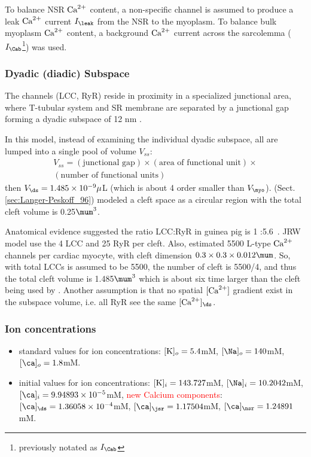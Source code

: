 To balance NSR ${\text{Ca}^{2+}}$ content, a non-specific channel is assumed to produce a
leak ${\text{Ca}^{2+}}$ current $I_\leak$ from the NSR to the myoplasm. To balance bulk 
myoplasm ${\text{Ca}^{2+}}$ content, a background ${\text{Ca}^{2+}}$ current across the sarcolemma
($I_\Cab$\footnote{previously notated as $I_\Cab$}) was used.

\subsubsection{Dyadic (diadic) Subspace}
\label{sec:diadic_subspace}


The channels (LCC, RyR) reside in proximity in a specialized
junctional area, where T-tubular system and SR membrane are
separated by a junctional gap forming a dyadic subspace of 12 nm
\citep{frank1990}.

In this model, instead of examining the individual dyadic subspace, all are
lumped into a single pool of volume $V_{ss}$:
\begin{equation}
  \label{eq:778}
  \begin{split}
    V_{ss} = (\text{junctional gap})\times (\text{area of functional
      unit}) \times \\
    (\text{number of functional units})
  \end{split}
\end{equation}
then $V_\ds = 1.485\times 10^{-9}\mu$L (which is about 4 order
smaller than $V_\myo$). \citep{langer1996} (Sect.\ref{sec:Langer-Peskoff_96})
modeled a cleft space as a circular region with the total cleft volume is 0.25$\mum^3$.

Anatomical evidence suggested the ratio LCC:RyR in guinea pig is 1
:5.6~\citep{bers1992}. JRW model use the 4 LCC and 25 RyR per cleft.
Also, \citep{isenberg1995} estimated 5500 L-type ${\text{Ca}^{2+}}$ channels per cardiac
myocyte, with cleft dimension $0.3\times 0.3\times 0.012\mum$. So, with total
LCCs is assumed to be 5500, the number of cleft is 5500/4, and thus the total
cleft volume is 1.485$\mum^3$ which is about six time larger than the cleft
being used by \citep{langer1996}. Another assumption is that no spatial $[{\text{Ca}^{2+}}]$
gradient exist in the subspace volume, i.e. all RyR see the same $[\Ca]_\ds$.


\subsubsection{Ion concentrations}


\begin{itemize}
\item standard values for ion concentrations: $[\ce{K}]_o=5.4$mM,
  $[\Na]_o=140$mM, $[\ca]_o=1.8$mM.
  
\item initial values for ion concentrations: $[\ce{K}]_i=143.727$mM,
  $[\Na]_i=10.2042$mM, $[\ca]_i=9.94893\times 10^{-5}$mM,
  \textcolor{red}{new Calcium components}: $[\ca]_\ds=1.36058\times
 10^{-4}$mM, $[\ca]_\jsr=1.17504$mM, $[\ca]_\nsr=1.24891$mM.
  
\end{itemize}

